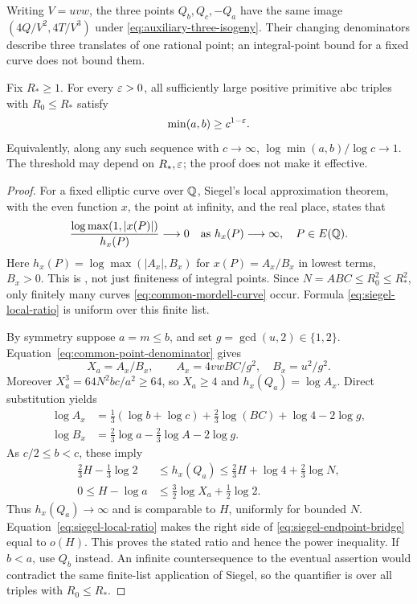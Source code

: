 Writing $V=uvw$, the three points $Q_b,Q_c,-Q_a$ have the same image
$(4Q/V^2,4T/V^3)$ under \eqref{eq:auxiliary-three-isogeny}.
Their changing denominators describe three translates of one rational
point; an integral-point bound for a fixed curve does not bound them.

\begin{theorem}
\label{thm:fixed-cubic-balance}
Fix $R_*\ge1$. For every $\varepsilon>0$, all sufficiently large positive
primitive abc triples with $R_0\le R_*$ satisfy
\[
 \min(a,b)\ge c^{1-\varepsilon}.
\]
Equivalently, along any such sequence with $c\to\infty$,
$\log\min(a,b)/\log c\to1$. The threshold may depend on $R_*,\varepsilon$;
the proof does not make it effective.
\end{theorem}
\begin{proof}
For a fixed elliptic curve over $\mathbb Q$, Siegel's local approximation
theorem, with the even function $x$, the point at infinity, and the
real place, states that
\begin{equation}\label{eq:siegel-local-ratio}
 \frac{\log\max(1,|x(P)|)}{h_x(P)}\longrightarrow0
 \quad\text{as }h_x(P)\longrightarrow\infty,
 \quad P\in E(\mathbb Q).
\end{equation}
Here $h_x(P)=\log\max(|A_x|,B_x)$ for $x(P)=A_x/B_x$ in lowest
terms, $B_x>0$. This is \cite[Theorem~IX.3.1 and Example~IX.3.3]{Silverman},
not just finiteness of integral points.
Since $N=ABC\le R_0^2\le R_*^2$, only finitely many curves
\eqref{eq:common-mordell-curve} occur. Formula
\eqref{eq:siegel-local-ratio} is uniform over this finite list.

By symmetry suppose $a=m\le b$, and set $g=\gcd(u,2)\in\{1,2\}$.
Equation~\eqref{eq:common-point-denominator} gives
\[
 X_a=A_x/B_x,
 \qquad A_x=4vwBC/g^2,\quad B_x=u^2/g^2.
\]
Moreover $X_a^3=64N^2bc/a^2\ge64$, so $X_a\ge4$ and
$h_x(Q_a)=\log A_x$. Direct substitution yields
\begin{align*}
 \log A_x&=\tfrac13(\log b+\log c)+\tfrac23\log(BC)
                 +\log4-2\log g,\\
 \log B_x&=\tfrac23\log a-\tfrac23\log A-2\log g.
\end{align*}
As $c/2\le b<c$, these imply
\begin{align}
 \tfrac23H-\tfrac13\log2
 &\le h_x(Q_a)\le\tfrac23H+\log4+\tfrac23\log N,
 \label{eq:siegel-height-bridge}\\
 0\le H-\log a
 &\le\tfrac32\log X_a+\tfrac12\log2.
 \label{eq:siegel-endpoint-bridge}
\end{align}
Thus $h_x(Q_a)\to\infty$ and is comparable to $H$, uniformly for
bounded $N$. Equation~\eqref{eq:siegel-local-ratio} makes the right
side of \eqref{eq:siegel-endpoint-bridge} equal to $o(H)$.
This proves the stated ratio and hence the power inequality. If
$b<a$, use $Q_b$ instead. An infinite countersequence to the eventual
assertion would contradict the same finite-list application of Siegel,
so the quantifier is over all triples with $R_0\le R_*$.
\end{proof}

